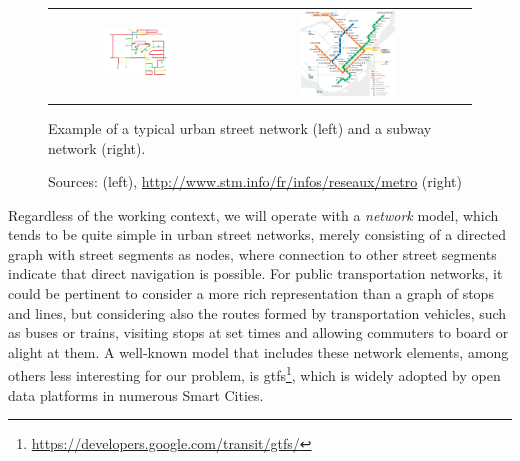 \documentclass[a4paper,10pt,twoside]{book}
\begin{document}
	\begin{figure}[t]
		\begin{center}
			\begin{tabular}{cc}
				\includegraphics[width=0.4\textwidth]{figures/road-network.png} &
				\includegraphics[width=0.4\textwidth]{figures/mtl-metro-cut.png} \\
			\end{tabular}
		\end{center}
		\caption{Example of a typical urban street network (left) and a subway network (right).}
		\caption*{\small Sources: \cite{boeing2017osmnx} (left), \url{http://www.stm.info/fr/infos/reseaux/metro} (right)}
		\label{fig:networks}
	\end{figure}
	
	Regardless of the working context, we will operate with a \textit{network} model, which tends to be quite simple in urban street networks, merely consisting of a directed graph with street segments as nodes, where connection to other street segments indicate that direct navigation is possible. For public transportation networks, it could be pertinent to consider a more rich representation than a graph of stops and lines, but considering also the routes formed by transportation vehicles, such as buses or trains, visiting stops at set times and allowing commuters to board or alight at them. A well-known model that includes these network elements, among others less interesting for our problem, is \gls{gtfs}\footnote{\url{https://developers.google.com/transit/gtfs/}}, which is widely adopted by open data platforms in numerous Smart Cities.
	
\end{document}
